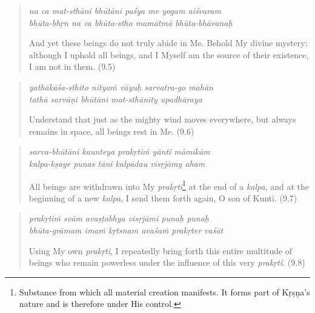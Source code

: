 \documentclass[12pt, twoside, openright]{memoir}
\begin{document}
\par
\begin{verse}
\textit{na ca mat-sthāni bhūtāni paśya me yogam aiśvaram} \\
\textit{bhūta-bhṛn na ca bhūta-stho mamātmā bhūta-bhāvanaḥ}

\noindent And yet these beings do not truly abide in Me. Behold My divine mystery: although I uphold all beings, and I Myself am the source of their existence, I am not in them. (9.5)
\end{verse}
\par



\par
\begin{verse}
\textit{yathākāśa-sthito nityaṁ vāyuḥ sarvatra-go mahān} \\
\textit{tathā sarvāṇi bhūtāni mat-sthānīty upadhāraya}

\noindent Understand that just as the mighty wind moves everywhere, but always remains in space, all beings rest in Me. (9.6)
\end{verse}
\par



\par
\begin{verse}
\textit{sarva-bhūtāni kaunteya prakṛtiṁ yānti māmikām} \\
\textit{kalpa-kṣaye punas tāni kalpādau visṛjāmy aham}

\noindent All beings are withdrawn into My \textit{prakṛti}\footnote{Substance from which all material creation manifests. It forms part of Kṛṣṇa's nature and is therefore under His control.} at the end of a \textit{kalpa}, and at the beginning of a new \textit{kalpa}, I send them forth again, O son of Kuntī. (9.7)
\end{verse}
\par



\par
\begin{verse}
\textit{prakṛtiṁ svām avaṣṭabhya visṛjāmi punaḥ punaḥ} \\
\textit{bhūta-grāmam imaṁ kṛtsnam avaśaṁ prakṛter vaśāt}

\noindent Using My own \textit{prakṛti}, I repeatedly bring forth this entire multitude of beings who remain powerless under the influence of this very \textit{prakṛti}. (9.8)
\end{verse}
\par
\end{document}
